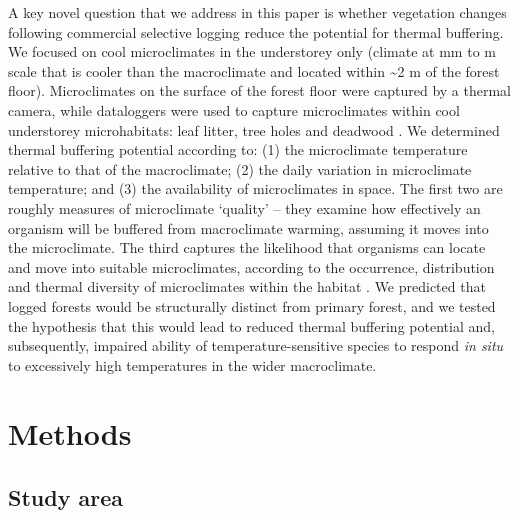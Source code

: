 \documentclass[12pt,a4paper,]{report}
\theoremstyle{definition}
\theoremstyle{definition}
\theoremstyle{definition}
\theoremstyle{remark}
\begin{document}
A key novel question that we address in this paper is whether vegetation
changes following commercial selective logging reduce the potential for
thermal buffering. We focused on cool microclimates in the understorey
only (climate at mm to m scale that is cooler than the macroclimate and
located within \textasciitilde{}2 m of the forest floor). Microclimates
on the surface of the forest floor were captured by a thermal camera,
while dataloggers were used to capture microclimates within cool
understorey microhabitats: leaf litter, tree holes and deadwood
\citep{scheffers_microhabitats_2014-1, scheffers_microhabitats_2014, gonzalez_del_pliego_thermally_2016}.
We determined thermal buffering potential according to: (1) the
microclimate temperature relative to that of the macroclimate; (2) the
daily variation in microclimate temperature; and (3) the availability of
microclimates in space. The first two are roughly measures of
microclimate `quality' -- they examine how effectively an organism will
be buffered from macroclimate warming, assuming it moves into the
microclimate. The third captures the likelihood that organisms can
locate and move into suitable microclimates, according to the
occurrence, distribution and thermal diversity of microclimates within
the habitat \citep{sears_world_2011, caillon_warming_2014}. We predicted
that logged forests would be structurally distinct from primary forest,
and we tested the hypothesis that this would lead to reduced thermal
buffering potential and, subsequently, impaired ability of
temperature-sensitive species to respond \emph{in situ} to excessively
high temperatures in the wider macroclimate.

\section{Methods}\label{methods-2}

\subsection{Study area}\label{study-area}
\end{document}
